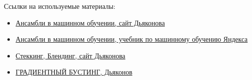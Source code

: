 Ссылки на используемые материалы:
\begin{itemize}
    \item \href{https://alexanderdyakonov.wordpress.com/2019/04/19/%D0%B0%D0%BD%D1%81%D0%B0%D0%BC%D0%B1%D0%BB%D0%B8-%D0%B2-%D0%BC%D0%B0%D1%88%D0%B8%D0%BD%D0%BD%D0%BE%D0%BC-%D0%BE%D0%B1%D1%83%D1%87%D0%B5%D0%BD%D0%B8%D0%B8}{Ансамбли в машинном обучении, сайт Дьяконова}
    \item \href{https://academy.yandex.ru/handbook/ml/article/ansambli-v-mashinnom-obuchenii}{Ансамбли в машинном обучении, учебник по машинному обучению Яндекса}
    \item \href{https://alexanderdyakonov.wordpress.com/2017/03/10/c%d1%82%d0%b5%d0%ba%d0%b8%d0%bd%d0%b3-stacking-%d0%b8-%d0%b1%d0%bb%d0%b5%d0%bd%d0%b4%d0%b8%d0%bd%d0%b3-blending/}{Стеккинг, Блендинг, сайт Дьяконова}
    \item \href{http://dyakonov.org/2017/06/09/%d0%b3%d1%80%d0%b0%d0%b4%d0%b8%d0%b5%d0%bd%d1%82%d0%bd%d1%8b%d0%b9-%d0%b1%d1%83%d1%81%d1%82%d0%b8%d0%bd%d0%b3/}{ГРАДИЕНТНЫЙ БУСТИНГ, Дьяконов}
\end{itemize}